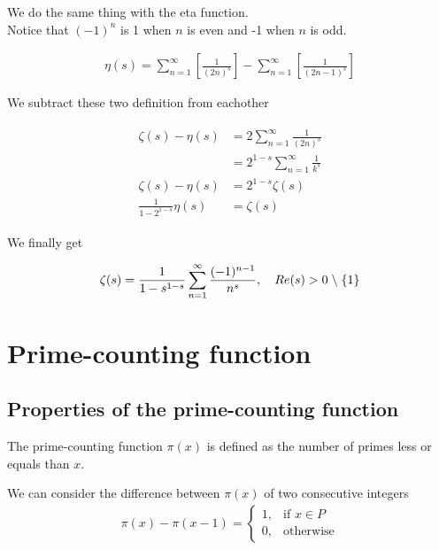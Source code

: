 \documentclass{article}
\newcommand{\exceptone}{
    \hspace{0.1cm}\backslash\hspace{0.1cm}\{ 1\}
}
\begin{document}
We do the same thing with the eta function.
\\
Notice that $(-1)^n$ is 1 when $n$ is even and -1 when $n$ is odd.

\begin{align*}
    \eta(s)=
    \sum_{n=1}^{\infty}\left[\frac{1}{(2n)^s}\right]-
    \sum_{n=1}^{\infty}\left[\frac{1}{(2n-1)^s}\right]
\end{align*}

We subtract these two definition from eachother

\begin{align*}
    \begin{split}
        \zeta(s)-\eta(s)&=
        2\sum_{n=1}^{\infty}\frac{1}{(2n)^s}\\
        &=2^{1-s}\sum_{n=1}^{\infty}\frac{1}{k^s}\\
        \zeta(s)-\eta(s)&=2^{1-s}\zeta(s)\\
        \frac{1}{1-2^{1-s}}\eta(s)&=\zeta(s)
    \end{split}
\end{align*}

We finally get

\begin{align*}
    \zeta(s)=\frac{1}{1-s^{1-s}}\sum_{n=1}^{\infty}\frac{(-1)^{n-1}}{n^s},
    \quad Re(s)>0\exceptone
\end{align*}

\pagebreak

\section{Prime-counting function}

\subsection{Properties of the prime-counting function}

The prime-counting function $\pi (x)$ is defined as the number of primes less or equals than $x$.

We can consider the difference between $\pi (x)$ of two consecutive integers
\begin{align*}
    \pi (x)-\pi (x-1)= 
    \begin{cases}
        1,& \text{if } x\in P
        \\
        0,& \text{otherwise}
    \end{cases}
\end{align*}
\end{document}
